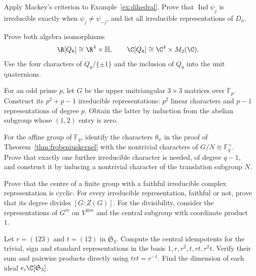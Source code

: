 \begin{exercise}[$\star$]\label{ex:dihedralmackey}
Apply Mackey's criterion to Example~\ref{ex:dihedral}. Prove that $\operatorname{Ind}\psi_j$ is irreducible exactly when $\psi_j\ne\psi_{-j}$, and list all irreducible representations of $D_n$.
\end{exercise}

\begin{exercise}[$\star\star$]\label{ex:rq8}
Prove both algebra isomorphisms
\[
\R[Q_8]\cong\R^4\times\mathbb H,
\qquad \C[Q_8]\cong\C^4\times M_2(\C).
\]
Use the four characters of $Q_8/\{\pm1\}$ and the inclusion of $Q_8$ into the unit quaternions.
\end{exercise}

\begin{exercise}[$\star\star$]\label{ex:heisenberg}
For an odd prime $p$, let $G$ be the upper unitriangular $3\times3$ matrices over $\mathbb F_p$. Construct its $p^2+p-1$ irreducible representations: $p^2$ linear characters and $p-1$ representations of degree $p$. Obtain the latter by induction from the abelian subgroup whose $(1,2)$ entry is zero.
\end{exercise}

\begin{exercise}[$\star\star$]\label{ex:affinefrob}
For the affine group of $\mathbb F_q$, identify the characters $\theta_\psi$ in the proof of Theorem~\ref{thm:frobeniuskernel} with the nontrivial characters of $G/N\cong\mathbb F_q^\times$. Prove that exactly one further irreducible character is needed, of degree $q-1$, and construct it by inducing a nontrivial character of the translation subgroup $N$.
\end{exercise}

\begin{exercise}[$\star\star\star$]\label{ex:centrefaithful}
Prove that the centre of a finite group with a faithful irreducible complex representation is cyclic. For every irreducible representation, faithful or not, prove that its degree divides $[G:Z(G)]$. For the divisibility, consider the representations of $G^m$ on $V^{\otimes m}$ and the central subgroup with coordinate product $1$.
\end{exercise}

\begin{exercise}[$\star\star$]\label{ex:v10new-ch09-s3idempotents}
Let $r=(123)$ and $t=(12)$ in $\mathfrak S_3$. Compute the central idempotents for the trivial, sign and standard representations in the basis $1,r,r^2,t,rt,r^2t$. Verify their sum and pairwise products directly using $trt=r^{-1}$. Find the dimension of each ideal $e_i\C[\mathfrak S_3]$.
\end{exercise}

